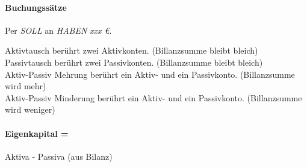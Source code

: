 \paragraph{Buchungssätze} Per \emph{SOLL} an \emph{HABEN} \emph{xxx \euro}.

Aktivtausch berührt zwei Aktivkonten. (Billanzsumme bleibt bleich)\\
Passivtausch berührt zwei Passivkonten. (Billanzsumme bleibt bleich)\\
Aktiv-Passiv Mehrung berührt ein Aktiv- und ein Passivkonto. (Billanzsumme wird mehr)\\
Aktiv-Passiv Minderung berührt ein Aktiv- und ein Passivkonto. (Billanzsumme wird weniger)

\paragraph{Eigenkapital =} Aktiva - Passiva (aus Bilanz)